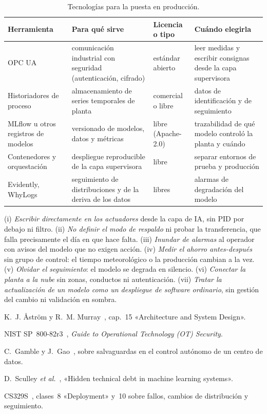 \begin{table}[htbp]
\centering\footnotesize
\begin{tabularx}{\textwidth}{@{}>{\raggedright\arraybackslash}p{3.1cm}>{\raggedright\arraybackslash}X>{\raggedright\arraybackslash}p{2.0cm}>{\raggedright\arraybackslash}X@{}}
\toprule
Herramienta & Para qué sirve & Licencia o tipo & Cuándo elegirla \\
\midrule
OPC UA & comunicación industrial con seguridad (autenticación, cifrado) & estándar abierto & leer medidas y escribir consignas desde la capa supervisora \\
Historiadores de proceso & almacenamiento de series temporales de planta & comercial o libre & datos de identificación y de seguimiento \\
MLflow u otros registros de modelos & versionado de modelos, datos y métricas & libre (Apache-2.0) & trazabilidad de qué modelo controló la planta y cuándo \\
Contenedores y orquestación & despliegue reproducible de la capa supervisora & libre & separar entornos de prueba y producción \\
Evidently, WhyLogs & seguimiento de distribuciones y de la deriva de los datos & libres & alarmas de degradación del modelo \\
\bottomrule
\end{tabularx}
\caption{Tecnologías para la puesta en producción.}
\label{tab:tec6}
\end{table}

\begin{observacion}\label{obs:errores6}
(i) \emph{Escribir directamente en los actuadores} desde la capa de IA, sin PID por debajo ni filtro. (ii) \emph{No definir el modo de respaldo} ni probar la transferencia, que falla precisamente el día en que hace falta. (iii) \emph{Inundar de alarmas} al operador con avisos del modelo que no exigen acción. (iv) \emph{Medir el ahorro antes-después} sin grupo de control: el tiempo meteorológico o la producción cambian a la vez. (v) \emph{Olvidar el seguimiento}: el modelo se degrada en silencio. (vi) \emph{Conectar la planta a la nube} sin zonas, conductos ni autenticación. (vii) \emph{Tratar la actualización de un modelo como un despliegue de software ordinario}, sin gestión del cambio ni validación en sombra.
\end{observacion}

\begin{lecturas}
\item K.~J. Åström y R.~M. Murray~\cite{am}, cap.~15 «Architecture and System Design».
\item NIST SP~800-82r3~\cite{nist}, \emph{Guide to Operational Technology (OT) Security}.
\item C.~Gamble y J.~Gao~\cite{gamblegao}, sobre salvaguardas en el control autónomo de un centro de datos.
\item D.~Sculley \emph{et al.}~\cite{sculley}, «Hidden technical debt in machine learning systems».
\item CS329S~\cite{cs329s}, clases~8 «Deployment» y~10 sobre fallos, cambios de distribución y seguimiento.
\end{lecturas}

